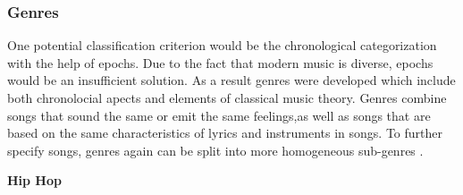 \subsubsection{Genres}

One potential classification criterion would be the chronological categorization with the help of epochs. 
Due to the fact that modern music is diverse, epochs would be an insufficient solution. As a result genres 
were developed which include both chronolocial apects and elements of classical music theory. Genres combine 
songs that sound the same or emit the same feelings,as well as songs that are based on the same characteristics 
of lyrics and instruments in songs. To further specify songs, genres again can be split into more homogeneous 
sub-genres \cite{MusicflxRichtungen}. 



\textbf{Hip Hop}

